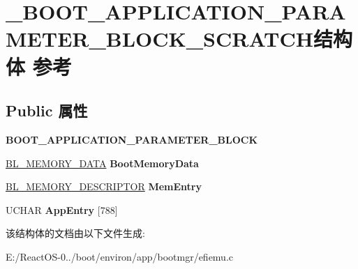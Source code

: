 \hypertarget{struct___b_o_o_t___a_p_p_l_i_c_a_t_i_o_n___p_a_r_a_m_e_t_e_r___b_l_o_c_k___s_c_r_a_t_c_h}{}\section{\+\_\+\+B\+O\+O\+T\+\_\+\+A\+P\+P\+L\+I\+C\+A\+T\+I\+O\+N\+\_\+\+P\+A\+R\+A\+M\+E\+T\+E\+R\+\_\+\+B\+L\+O\+C\+K\+\_\+\+S\+C\+R\+A\+T\+C\+H结构体 参考}
\label{struct___b_o_o_t___a_p_p_l_i_c_a_t_i_o_n___p_a_r_a_m_e_t_e_r___b_l_o_c_k___s_c_r_a_t_c_h}
\subsection*{Public 属性}
\begin{DoxyCompactItemize}
\item 
\mbox{\label{struct___b_o_o_t___a_p_p_l_i_c_a_t_i_o_n___p_a_r_a_m_e_t_e_r___b_l_o_c_k___s_c_r_a_t_c_h_a87d5f1522e2c80d64253d6d795b9e45c}} 
{\bfseries B\+O\+O\+T\+\_\+\+A\+P\+P\+L\+I\+C\+A\+T\+I\+O\+N\+\_\+\+P\+A\+R\+A\+M\+E\+T\+E\+R\+\_\+\+B\+L\+O\+CK}
\item 
\mbox{\label{struct___b_o_o_t___a_p_p_l_i_c_a_t_i_o_n___p_a_r_a_m_e_t_e_r___b_l_o_c_k___s_c_r_a_t_c_h_a05bcf01527bc2b08042ef944517b000a}} 
\hyperlink{struct___b_l___m_e_m_o_r_y___d_a_t_a}{B\+L\+\_\+\+M\+E\+M\+O\+R\+Y\+\_\+\+D\+A\+TA} {\bfseries Boot\+Memory\+Data}
\item 
\mbox{\label{struct___b_o_o_t___a_p_p_l_i_c_a_t_i_o_n___p_a_r_a_m_e_t_e_r___b_l_o_c_k___s_c_r_a_t_c_h_a2cef46c1dd4d98ef94a5183092d1eeaa}} 
\hyperlink{struct___b_l___m_e_m_o_r_y___d_e_s_c_r_i_p_t_o_r}{B\+L\+\_\+\+M\+E\+M\+O\+R\+Y\+\_\+\+D\+E\+S\+C\+R\+I\+P\+T\+OR} {\bfseries Mem\+Entry}
\item 
\mbox{\label{struct___b_o_o_t___a_p_p_l_i_c_a_t_i_o_n___p_a_r_a_m_e_t_e_r___b_l_o_c_k___s_c_r_a_t_c_h_a1808de9bea2edba3e8ebf2c3275c30df}} 
U\+C\+H\+AR {\bfseries App\+Entry} \mbox{[}788\mbox{]}
\end{DoxyCompactItemize}


该结构体的文档由以下文件生成\+:\begin{DoxyCompactItemize}
\item 
E\+:/\+React\+O\+S-\/0../boot/environ/app/bootmgr/efiemu.\+c\end{DoxyCompactItemize}
